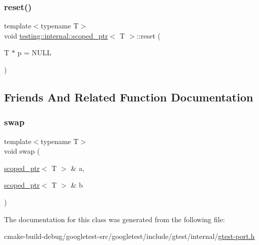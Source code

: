 \mbox{\label{classtesting_1_1internal_1_1scoped__ptr_acac03266a43359801aff0de5c990bec0}} 
\subsubsection{\texorpdfstring{reset()}{reset()}}
{\footnotesize\ttfamily template$<$typename T$>$ \\
void \mbox{\hyperlink{classtesting_1_1internal_1_1scoped__ptr}{testing\+::internal\+::scoped\+\_\+ptr}}$<$ T $>$\+::reset (\begin{DoxyParamCaption}\item[{T $\ast$}]{p = {\ttfamily NULL} }\end{DoxyParamCaption})\hspace{0.3cm}{\ttfamily [inline]}}



\subsection{Friends And Related Function Documentation}
\mbox{\label{classtesting_1_1internal_1_1scoped__ptr_a01bc0441e6a3ebf26807ac523392ca86}} 
\subsubsection{\texorpdfstring{swap}{swap}}
{\footnotesize\ttfamily template$<$typename T$>$ \\
void swap (\begin{DoxyParamCaption}\item[{\mbox{\hyperlink{classtesting_1_1internal_1_1scoped__ptr}{scoped\+\_\+ptr}}$<$ T $>$ \&}]{a,  }\item[{\mbox{\hyperlink{classtesting_1_1internal_1_1scoped__ptr}{scoped\+\_\+ptr}}$<$ T $>$ \&}]{b }\end{DoxyParamCaption})\hspace{0.3cm}{\ttfamily [friend]}}



The documentation for this class was generated from the following file\+:\begin{DoxyCompactItemize}
\item 
cmake-\/build-\/debug/googletest-\/src/googletest/include/gtest/internal/\mbox{\hyperlink{gtest-port_8h}{gtest-\/port.\+h}}\end{DoxyCompactItemize}
